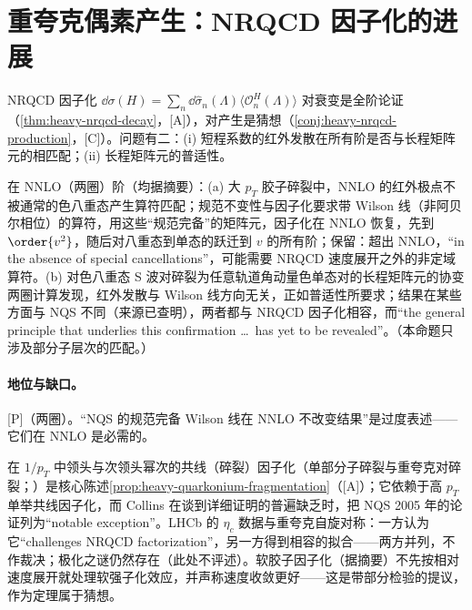 \section{重夸克偶素产生：NRQCD 因子化的进展}\label{sec:front-quarkonium}

NRQCD 因子化\cite{BodwinBraatenLepage1995} $\dd\sigma(H)=\sum_n\dd\hat\sigma_n(\Lambda)\langle\mathcal O^H_n(\Lambda)\rangle$ 对衰变是全阶论证（\cref{thm:heavy-nrqcd-decay}，[A]），对产生是猜想（\cref{conj:heavy-nrqcd-production}，[C]）。问题有二：(i) 短程系数的红外发散在所有阶是否与长程矩阵元的相匹配；(ii) 长程矩阵元的普适性。

\begin{proposition}\label{prop:front-nrqcd-ir}
在 NNLO（两圈）阶（均据摘要）：(a) 大 $p_T$ 胶子碎裂中，NNLO 的红外极点不被通常的色八重态产生算符匹配；规范不变性与因子化要求带 Wilson 线（非阿贝尔相位）的算符，用这些“规范完备”的矩阵元，因子化在 NNLO 恢复，先到 $\order{v^2}$，随后对八重态到单态的跃迁到 $v$ 的所有阶\cite{NayakQiuSterman2005a,NayakQiuSterman2005b,NayakQiuSterman2006}；保留：超出 NNLO，“in the absence of special cancellations”，可能需要 NRQCD 速度展开之外的非定域算符。(b) 对色八重态 S 波对碎裂为任意轨道角动量色单态对的长程矩阵元的协变两圈计算发现，红外发散与 Wilson 线方向无关，正如普适性所要求；结果在某些方面与 NQS 不同（来源已查明），两者都与 NRQCD 因子化相容，而“the general principle that underlies this confirmation \dots\ has yet to be revealed”\cite{Bodwin:2019bpf}。（本命题只涉及部分子层次的匹配。）
\end{proposition}

\paragraph{地位与缺口。}[P]（两圈）。“NQS 的规范完备 Wilson 线在 NNLO 不改变结果”是过度表述——它们在 NNLO 是必需的。

\begin{remark}[唯象张力与替代方案]\label{rem:front-quarkonium-alternatives}
在 $1/p_T$ 中领头与次领头幂次的共线（碎裂）因子化（单部分子碎裂与重夸克对碎裂；\cite{Kang:2011mg,Kang:2014tta,Kang:2014pya,Fleming:2012wy,Ma:2013yla,Ma:2014eja,Bodwin:2014gia}）是核心陈述\cref{prop:heavy-quarkonium-fragmentation}（[A]）；它依赖于高 $p_T$ 单举共线因子化，而 Collins 在谈到详细证明的普遍缺乏时，把 NQS 2005 年的论证列为“notable exception”\cite[第~14.7~节，第~570--571~页]{Collins2011}。LHCb 的 $\eta_c$ 数据与重夸克自旋对称：一方认为它“challenges NRQCD factorization”\cite{Butenschoen:2014dra}，另一方得到相容的拟合\cite{Han:2014jya,Zhang:2014ybe}——两方并列，不作裁决；极化之谜仍然存在（此处不评述）。软胶子因子化\cite{Ma:2017xno}（据摘要）不先按相对速度展开就处理软强子化效应，并声称速度收敛更好——这是带部分检验的提议，作为定理属于猜想。
\end{remark}

